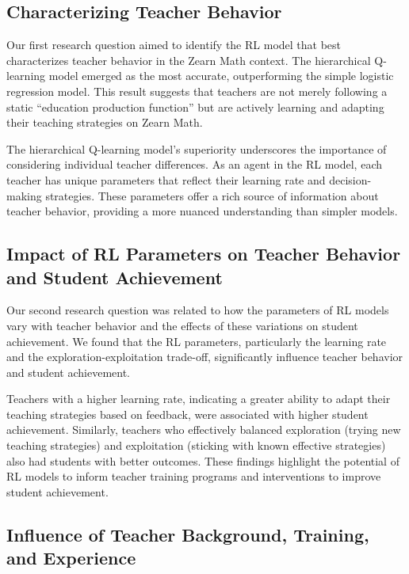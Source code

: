 \documentclass[
  number,
  preprint,
  3p,
  onecolumn]{elsarticle}
\begin{document}
\hypertarget{characterizing-teacher-behavior}{%
\subsection{Characterizing Teacher
Behavior}\label{characterizing-teacher-behavior}}

Our first research question aimed to identify the RL model that best
characterizes teacher behavior in the Zearn Math context. The
hierarchical Q-learning model emerged as the most accurate,
outperforming the simple logistic regression model. This result suggests
that teachers are not merely following a static ``education production
function'' but are actively learning and adapting their teaching
strategies on Zearn Math.

The hierarchical Q-learning model's superiority underscores the
importance of considering individual teacher differences. As an agent in
the RL model, each teacher has unique parameters that reflect their
learning rate and decision-making strategies. These parameters offer a
rich source of information about teacher behavior, providing a more
nuanced understanding than simpler models.

\hypertarget{impact-of-rl-parameters-on-teacher-behavior-and-student-achievement}{%
\subsection{Impact of RL Parameters on Teacher Behavior and Student
Achievement}\label{impact-of-rl-parameters-on-teacher-behavior-and-student-achievement}}

Our second research question was related to how the parameters of RL
models vary with teacher behavior and the effects of these variations on
student achievement. We found that the RL parameters, particularly the
learning rate and the exploration-exploitation trade-off, significantly
influence teacher behavior and student achievement.

Teachers with a higher learning rate, indicating a greater ability to
adapt their teaching strategies based on feedback, were associated with
higher student achievement. Similarly, teachers who effectively balanced
exploration (trying new teaching strategies) and exploitation (sticking
with known effective strategies) also had students with better outcomes.
These findings highlight the potential of RL models to inform teacher
training programs and interventions to improve student achievement.

\hypertarget{influence-of-teacher-background-training-and-experience}{%
\subsection{Influence of Teacher Background, Training, and
Experience}\label{influence-of-teacher-background-training-and-experience}}
\end{document}
